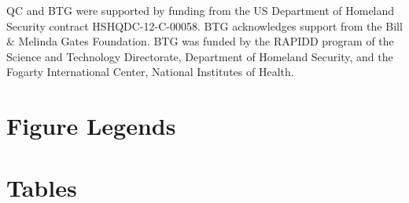 \documentclass[10pt]{article}
\begin{document}
QC and BTG were supported by funding from the US Department of Homeland Security contract HSHQDC-12-C-00058. BTG acknowledges support from the Bill \& Melinda Gates Foundation. BTG was funded by the RAPIDD program of the Science and Technology Directorate, Department of Homeland Security, and the Fogarty International Center, National Institutes of Health. 










\section*{Figure Legends}


\section*{Tables}
\end{document}
